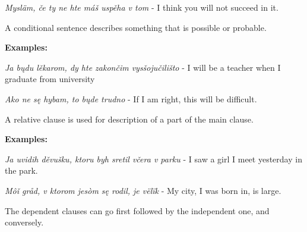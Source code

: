 \textit{Mysläm, če ty ne hte máš uspěha v tom} - I think you will not succeed in it.

A conditional sentence describes something that is possible or probable.

\textbf{Examples:}

\textit{Ja bųdu lěkarom, dy hte zakončim vysšojučilišto} - I will be a teacher when I graduate from university

\textit{Ako ne sę hybam, to bųde trudno} - If I am right, this will be difficult.

A relative clause is used for description of a part of the main clause.

\textbf{Examples:}

\textit{Ja uvidih děvušku, ktoru byh sretil včera v parku} - I saw a girl I meet yesterday in the park.

\textit{Môǐ gråd, v ktorom jesòm sę rodil, je vëlïk} - My city, I was born in, is large.

The dependent clauses can go first followed by the independent one, and conversely.

